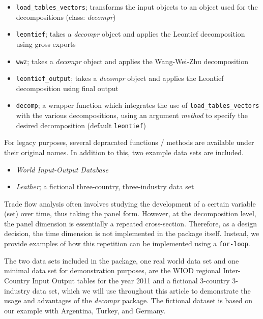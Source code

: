 \documentclass[a4paper,11pt]{article}
\begin{document}
\begin{itemize}
 \item \verb!load_tables_vectors!; transforms the input objects to an object used for the decompositions (class: \textit{decompr})
 \item \verb!leontief!; takes a \textit{decompr} object and applies the Leontief decomposition using gross exports
 \item \verb!wwz!; takes a \textit{decompr} object and applies the Wang-Wei-Zhu decomposition
 \item \verb!leontief_output!; takes a \textit{decompr} object and applies the Leontief decomposition using final output
 \item \verb!decomp!; a wrapper function which integrates the use of \verb!load_tables_vectors! with the various decompositions, using an argument \textit{method} to specify the desired decomposition (default \verb!leontief!) 
\end{itemize}

For legacy purposes, several depracated functions / methods are available under their original names.
In addition to this, two example data sets are included.

\begin{itemize}
  \item \textit{World Input-Output Database} \citep{mati12}
  \item \textit{Leather}; a fictional three-country, three-industry data set
\end{itemize}

Trade flow analysis often involves studying the development of a certain variable (set) over time, thus taking the panel form. However, at the decomposition level, the panel dimension is essentially a repeated cross-section.
Therefore, as a design decision, the time dimension is not implemented in the package itself. Instead, we provide examples of how this repetition can be implemented using a \verb!for-loop!.

The two data sets included in the package, one real world data set and one minimal data set for demonstration purposes, are the WIOD regional Inter-Country Input Output tables for the year 2011 \citep{mati12} and a fictional 3-country 3-industry data set, which we will use throughout this article to demonstrate the usage and advantages of the \textit{decompr} package. The fictional dataset is based on our example with Argentina, Turkey, and Germany.
\end{document}
